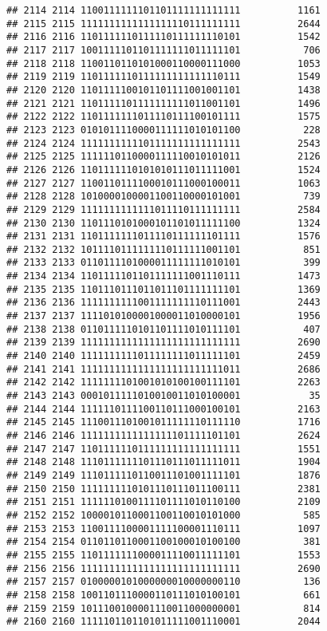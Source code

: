 \documentclass[]{article}
\begin{document}
\begin{verbatim}
## 2114 2114 1100111111101101111111111111          1161
## 2115 2115 1111111111111111110111111111          2644
## 2116 2116 1101111110111110111111110101          1542
## 2117 2117 1001111101101111111011111101           706
## 2118 2118 1100110110101000110000111000          1053
## 2119 2119 1101111110111111111111110111          1549
## 2120 2120 1101111100101101111001001101          1438
## 2121 2121 1101111101111111111011001101          1496
## 2122 2122 1101111111011110111100101111          1575
## 2123 2123 0101011110000111111010101100           228
## 2124 2124 1111111111101111111111111111          2543
## 2125 2125 1111110110000111110010101011          2126
## 2126 2126 1101111110101010111011111001          1524
## 2127 2127 1100110111100010111000100011          1063
## 2128 2128 1010000100001100110000101001           739
## 2129 2129 1111111111111011110111111111          2584
## 2130 2130 1101110101000101101011111100          1324
## 2131 2131 1101111111011110111111101111          1576
## 2132 2132 1011110111111110111111001101           851
## 2133 2133 0110111101000011111111010101           399
## 2134 2134 1101111101101111111001110111          1473
## 2135 2135 1101110111011011101111111101          1369
## 2136 2136 1111111111001111111110111001          2443
## 2137 2137 1111010100001000011010000101          1956
## 2138 2138 0110111110101101111010111101           407
## 2139 2139 1111111111111111111111111111          2690
## 2140 2140 1111111111011111111011111101          2459
## 2141 2141 1111111111111111111111111011          2686
## 2142 2142 1111111101001010100100111101          2263
## 2143 2143 0001011111010010011010100001            35
## 2144 2144 1111110111100110111000100101          2163
## 2145 2145 1110011101001011111110111110          1716
## 2146 2146 1111111111111111101111101101          2624
## 2147 2147 1101111110111111111111111111          1551
## 2148 2148 1110111111101110111011111011          1904
## 2149 2149 1110111110110011101001111101          1876
## 2150 2150 1111111110101110111011100111          2381
## 2151 2151 1111110100111101111010110100          2109
## 2152 2152 1000010110001100110010101000           585
## 2153 2153 1100111100001111100001110111          1097
## 2154 2154 0110110110001100100010100100           381
## 2155 2155 1101111111000011110011111101          1553
## 2156 2156 1111111111111111111111111111          2690
## 2157 2157 0100000101000000010000000110           136
## 2158 2158 1001101110000110111010100101           661
## 2159 2159 1011100100001110011000000001           814
## 2160 2160 1111101101101011111001110001          2044

\end{verbatim}
\end{document}
